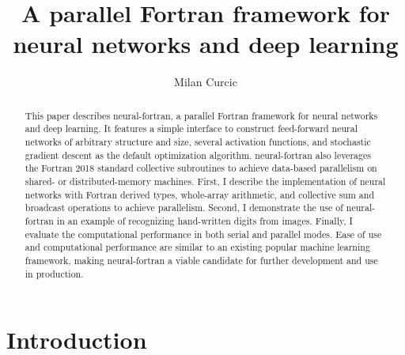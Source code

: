 \documentclass[sigplan, review=false, screen=true, balance=true]{acmart}
\begin{document}
\title{A parallel Fortran framework for neural networks and deep learning}

\author{Milan Curcic}

\begin{abstract}
This paper describes neural-fortran, a parallel Fortran framework for neural
networks and deep learning. It features a simple interface to construct
feed-forward neural networks of arbitrary structure and size, several activation
functions, and stochastic gradient descent as the default optimization algorithm.
neural-fortran also leverages the Fortran 2018 standard collective subroutines
to achieve data-based parallelism on shared- or distributed-memory machines.
First, I describe the implementation of neural networks with Fortran derived
types, whole-array arithmetic, and collective sum and broadcast operations
to achieve parallelism. Second, I demonstrate the use of neural-fortran in an
example of recognizing hand-written digits from images. Finally, I evaluate
the computational performance in both serial and parallel modes. Ease of use and
computational performance are similar to an existing popular machine learning
framework, making neural-fortran a viable candidate for further development and
use in production.
\end{abstract}


\maketitle

\section{Introduction}
\end{document}
